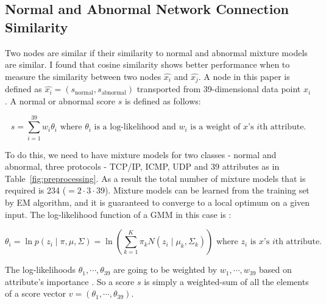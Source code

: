 \subsection{Normal and Abnormal Network Connection Similarity}
\label{subsec:normalabnormalsimilarity}
Two nodes are similar if their similarity to normal and abnormal mixture models are similar. 
I found that cosine similarity shows better performance when to measure the similarity between two nodes $\hat{x_i}$ and $\hat{x_j}$. 
A node in this paper is defined as $\hat{x_i} = (s_{\text{normal}}, s_{\text{abnormal}})$ transported from 39-dimensional data point $x_i$. 
A normal or abnormal score $s$ is defined as follows:

\begin{equation}
    s = \sum_{i=1}^{39} w_i \theta_i \text{ where $\theta_i$ is a log-likelihood and $w_i$ is a weight of $x$'s $i$th attribute.} 
\end{equation}

To do this, we need to have mixture models for two classes - normal and abnormal, three protocols - TCP/IP, ICMP, UDP and 39 attributes as in Table~\ref{fig:preprocessing}. 
As a result the total number of mixture models that is required is 234 ($= 2 \cdot 3 \cdot 39$).
Mixture models can be learned from the training set by EM algorithm, and it is guaranteed to converge to a local optimum on a given input. 
The log-likelihood function of a GMM in this case is :

\begin{equation}
    \theta_i = \ln p(z_i \mid \pi, \mu, \Sigma) = \ln (\sum_{k=1}^K \pi_k N(z_i \mid \mu_k, \Sigma_k)) \text{ where $z_i$ is $x$'s $i$th attribute.}
\end{equation}

The log-likelihoods $\theta_1, \cdots, \theta_{39}$ are going to be weighted by $w_1, \cdots, w_{39}$ based on attribute's importance \cite{kayacik05}. 
So a score $s$ is simply a weighted-sum of all the elements of a score vector $v = (\theta_1, \cdots, \theta_{39})$. 

